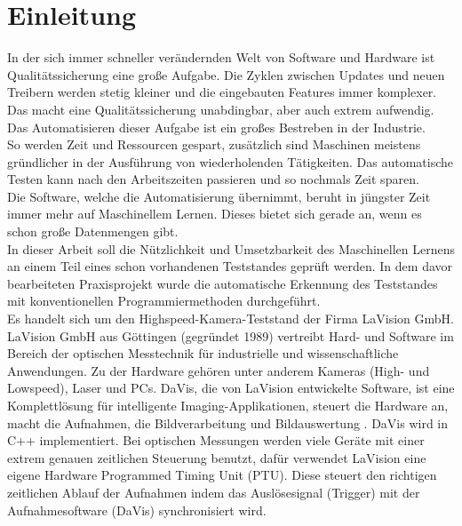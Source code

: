 \section{Einleitung}
In der sich immer schneller verändernden Welt von Software und Hardware ist Qualitätssicherung eine große Aufgabe.  Die Zyklen zwischen Updates und neuen Treibern werden stetig kleiner und die eingebauten Features immer komplexer. Das macht eine Qualitätssicherung unabdingbar,  aber auch extrem aufwendig. Das Automatisieren dieser Aufgabe ist ein großes Bestreben in der Industrie. \\
So werden Zeit und Ressourcen gespart, zusätzlich sind Maschinen meistens gründlicher in der Ausführung von wiederholenden Tätigkeiten.  Das automatische Testen kann nach den Arbeitszeiten passieren und so nochmals Zeit sparen.\\
Die Software, welche die Automatisierung übernimmt, beruht in jüngster Zeit immer mehr auf Maschinellem Lernen.  Dieses bietet sich gerade an, wenn es schon große Datenmengen gibt. \\
In dieser Arbeit soll die Nützlichkeit und Umsetzbarkeit des Maschinellen Lernens an einem Teil eines schon vorhandenen Teststandes geprüft werden.  In dem davor bearbeiteten Praxisprojekt wurde die automatische Erkennung des Teststandes mit konventionellen Programmiermethoden durchgeführt.\\
Es handelt sich um den Highspeed-Kamera-Teststand der Firma LaVision GmbH.  LaVision GmbH aus Göttingen (gegründet 1989) vertreibt Hard- und Software im Bereich der optischen Messtechnik für industrielle und wissenschaftliche Anwendungen. \cite{lavision.de} Zu der Hardware gehören unter anderem Kameras (High- und Lowspeed), Laser und PCs. DaVis, die von LaVision entwickelte Software, ist eine Komplettlösung für intelligente Imaging-Applikationen,  steuert die Hardware an,  macht die Aufnahmen,  die Bildverarbeitung und Bildauswertung . DaVis wird in C++ implementiert.  Bei optischen Messungen werden viele Geräte mit einer extrem genauen zeitlichen Steuerung benutzt,  dafür verwendet LaVision eine eigene Hardware Programmed Timing Unit (PTU).  Diese steuert den richtigen zeitlichen Ablauf der Aufnahmen indem das Auslösesignal (Trigger) mit der Aufnahmesoftware (DaVis) synchronisiert wird.

